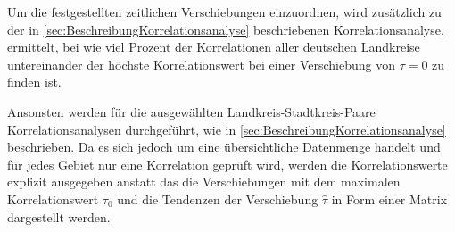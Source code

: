 Um die festgestellten zeitlichen Verschiebungen einzuordnen, wird zusätzlich zu der in \autoref{sec:BeschreibungKorrelationsanalyse} beschriebenen Korrelationsanalyse, ermittelt, bei wie viel Prozent der Korrelationen aller deutschen Landkreise untereinander der höchste Korrelationswert bei einer Verschiebung von $\tau = 0$ zu finden ist.

Ansonsten werden für die ausgewählten Landkreis-Stadtkreis-Paare Korrelationsanalysen durchgeführt, wie in \autoref{sec:BeschreibungKorrelationsanalyse} beschrieben. Da es sich jedoch um eine übersichtliche Datenmenge handelt und für jedes Gebiet nur eine Korrelation geprüft wird, werden die Korrelationswerte explizit ausgegeben anstatt das die Verschiebungen mit dem maximalen Korrelationswert $\tau_0$ und die Tendenzen der Verschiebung $\hat{\tau}$ in Form einer Matrix dargestellt werden.

